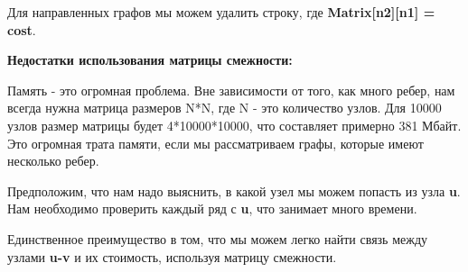 \vspace{\baselineskip}
Для направленных графов мы можем удалить строку, где \textbf{Matrix[n2][n1] = cost}.

\vspace{\baselineskip}
\textbf{Недостатки использования матрицы смежности:}

\vspace{\baselineskip}
Память - это огромная проблема. Вне зависимости от того, как много ребер, нам всегда нужна матрица размеров N*N, где N - это количество узлов. Для 10000 узлов размер матрицы будет 4*10000*10000, что составляет примерно 381 Мбайт. Это огромная трата памяти, если мы рассматриваем графы, которые имеют несколько ребер.

\vspace{\baselineskip}
Предположим, что нам надо выяснить, в какой узел мы можем попасть из узла \textbf{u}. Нам необходимо проверить каждый ряд с \textbf{u}, что занимает много времени.

\vspace{\baselineskip}
Единственное преимущество в том, что мы можем легко найти связь между узлами \textbf{u-v} и их стоимость, используя матрицу смежности.

